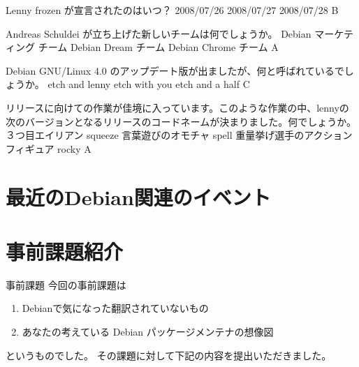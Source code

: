 \documentclass[cjk,dvipdfmx,12pt]{beamer}
\begin{document}
 \santaku
 {Lenny frozen が宣言されたのはいつ？}
 {2008/07/26}
 {2008/07/27}
 {2008/07/28}
 {B}
 
 \santaku
 {Andreas Schuldei が立ち上げた新しいチームは何でしょうか。}
 {Debian マーケティング チーム}
 {Debian Dream チーム}
 {Debian Chrome チーム}
 {A}

 \santaku
 {Debian GNU/Linux 4.0 のアップデート版が出ましたが、何と呼ばれているでしょうか。}
 {etch and lenny}
 {etch with you}
 {etch and a half}
 {C}

 \santaku
 {リリースに向けての作業が佳境に入っています。このような作業の中、lennyの次のバージョンとなるリリースのコードネームが決まりました。何でしょうか。}
 {３つ目エイリアン squeeze}%
 {言葉遊びのオモチャ spell}%
 {重量挙げ選手のアクションフィギュア rocky}%
 {A}



\section{最近のDebian関連のイベント}

\section{事前課題紹介}

\begin{frame}{事前課題}
今回の事前課題は
\begin{enumerate}
\item Debianで気になった翻訳されていないもの
\item あなたの考えている Debian パッケージメンテナの想像図
\end{enumerate}
というものでした。
その課題に対して下記の内容を提出いただきました。
\end{frame}
\end{document}
